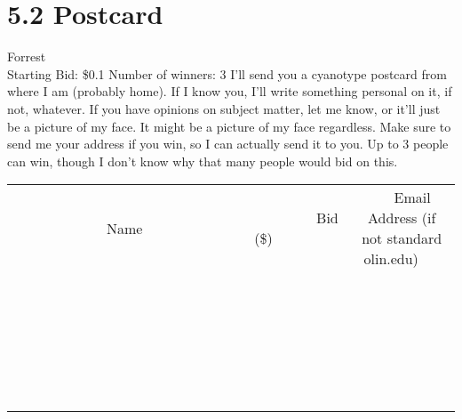 \documentclass[11pt]{article}
\begin{document}
\section*{5.2 Postcard}
Forrest
\\
Starting Bid: \$0.1
\newline
Number of winners: 3
\newline
I'll send you a cyanotype postcard from where I am (probably home). If I know you, I'll write something personal on it, if not, whatever. If you have opinions on subject matter, let me know, or it'll just be a picture of my face. It might be a picture of my face regardless. Make sure to send me your address if you win, so I can actually send it to you. Up to 3 people can win, though I don't know why that many people would bid on this.
\\[6ex]
\begin{tabular}{c c c}
~~~~~~~~~~~~~Name~~~~~~~~~~~~~ & ~~~~~~~~~Bid (\$)~~~~~~~~~  & ~~~Email Address (if not standard olin.edu)~~~\\
 & & \\
\hline
 & & \\
\hline
 & & \\
\hline
 & & \\
\hline
 & & \\
\hline
 & & \\
\hline
 & & \\
\hline
 & & \\
\hline
 & & \\
\hline
 & & \\
\hline
 & & \\
\hline
 & & \\
\hline
 & & \\
\hline
 & & \\
\hline
 & & \\
\hline
 & & \\
\hline
 & & \\
\hline
 & & \\
\hline
 & & \\
\hline
 & & \\
\hline
 & & \\
\hline
 & & \\
\hline
 & & \\
\hline
 & & \\
\hline
 & & \\
\hline
 & & \\
\hline
\end{tabular}
\newpage
\end{document}
